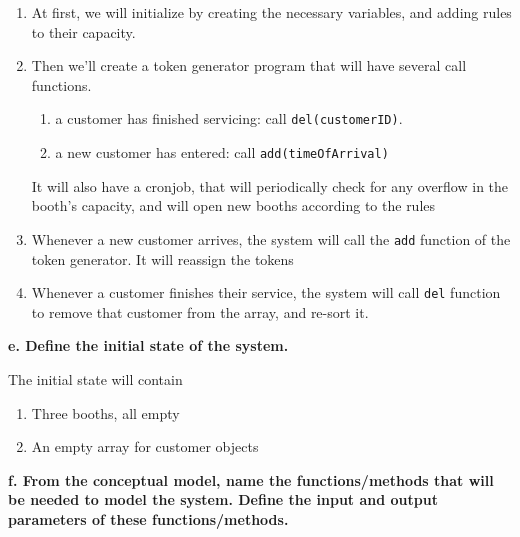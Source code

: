 \documentclass[article, 11pt, a4paper]{memoir}
\begin{document}
\begin{solution}
    [d] 
    \begin{enumerate}
        \item At first, we will initialize by creating the necessary variables, and adding
            rules to their capacity.
        \item Then we'll create a token generator program that will have several call
            functions.
            \begin{enumerate}
                \item a customer has finished servicing: call \texttt{del(customerID)}.
                \item a new customer has entered: call \texttt{add(timeOfArrival)}
            \end{enumerate}
            It will also have a cronjob, that will periodically check for any overflow in
            the booth's capacity, and will open new booths according to the rules
        \item Whenever a new customer arrives, the system will call the \texttt{add}
            function of the token generator. It will reassign the tokens
        \item Whenever a customer finishes their service, the system will call
            \texttt{del} function to remove that customer from the array, and re-sort it.
    \end{enumerate}
\end{solution}

\textbf{e. Define the initial state of the system.}
\vspace{1em}

\begin{solution}
    [e]
    The initial state will contain
    \begin{enumerate}
        \item Three booths, all empty
        \item An empty array for customer objects
    \end{enumerate}
\end{solution}

\textbf{f. From the conceptual model, name the functions/methods that will be needed to
model the system. Define the input and output parameters of these functions/methods.}
\vspace{1em}
\end{document}
